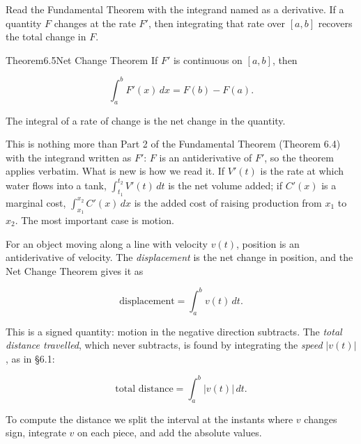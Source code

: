 \documentclass[a4paper,12pt,oneside]{memoir}
\begin{document}
Read the Fundamental Theorem with the integrand named as a derivative. If a quantity \(F\) changes at the rate \(F'\), then integrating that rate over \([a, b]\) recovers the total change in \(F\).

\begin{envtheorem}{Theorem}{6.5}{Net Change Theorem}
If \(F'\) is continuous on \([a, b]\), then

\[ \int_{a}^{b} F'(x)\,dx = F(b) - F(a). \]

The integral of a rate of change is the net change in the quantity.
\end{envtheorem}
This is nothing more than Part 2 of the Fundamental Theorem (Theorem 6.4) with the integrand written as \(F'\): \(F\) is an antiderivative of \(F'\), so the theorem applies verbatim. What is new is how we read it. If \(V'(t)\) is the rate at which water flows into a tank, \(\int_{t_{1}}^{t_{2}} V'(t)\,dt\) is the net volume added; if \(C'(x)\) is a marginal cost, \(\int_{x_{1}}^{x_{2}} C'(x)\,dx\) is the added cost of raising production from \(x_{1}\) to \(x_{2}\). The most important case is motion.

For an object moving along a line with velocity \(v(t)\), position is an antiderivative of velocity. The \emph{displacement} is the net change in position, and the Net Change Theorem gives it as

\[ \text{displacement} = \int_{a}^{b} v(t)\,dt. \]

This is a signed quantity: motion in the negative direction subtracts. The \emph{total distance travelled}, which never subtracts, is found by integrating the \emph{speed} \(\lvert v(t)\rvert\), as in §6.1:

\[ \text{total distance} = \int_{a}^{b} \lvert v(t)\rvert\,dt. \]

To compute the distance we split the interval at the instants where \(v\) changes sign, integrate \(v\) on each piece, and add the absolute values.
\end{document}
